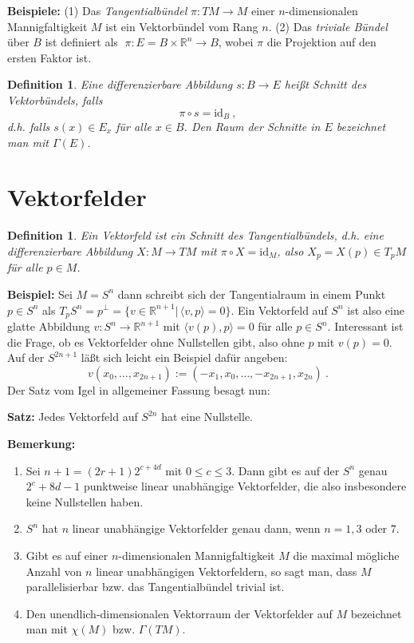 \documentclass[12pt,a4paper]{article}
\def\R{\mathbb{R}}
\def\id{\mathrm{id}}
\def\la{\langle}
\def\ra{\rangle}
\newtheorem{Definition}[Lemma]{Definition}
\begin{document}
\medskip


{\bf Beispiele:} (1) Das {\it Tangentialb\"undel} $\pi:TM\rightarrow M$ einer $n$-dimensionalen Mannigfaltigkeit
$M$ ist ein Vektorb\"undel vom Rang $n$. (2) Das {\it triviale B\"undel} \"uber $B$ ist definiert als
 $\;\pi: E=B\times \R^n\rightarrow B$,
wobei $\pi$ die Projektion auf den ersten Faktor ist.


\medskip


\begin{Definition}
Eine differenzierbare Abbildung $s:B\rightarrow E$ hei\ss t {\em Schnitt} des Vektorb\"undels, falls
$$
\pi \circ s = \id_B \ ,
$$
d.h. falls $s(x)\in E_x$ f\"ur alle $x\in B$. Den Raum der Schnitte in $E$ bezeichnet man mit $\Gamma(E)$.
\end{Definition}


\section{Vektorfelder}

\begin{Definition}
Ein {\em Vektorfeld} ist ein Schnitt des Tangentialb\"undels, d.h. eine differenzierbare
Abbildung $X:M\rightarrow TM$ mit $\pi\circ X = \id_M$, also $X_p=X(p) \in T_pM$ f\"ur
alle $p\in M$.
\end{Definition}

\medskip

{\bf Beispiel:} Sei $M=S^n$ dann schreibt sich der Tangentialraum in einem Punkt
$p\in S^n$ als $T_pS^n = p^\perp =  \{v \in \R^{n+1} | \, \la v, p \ra = 0\}$.
Ein Vektorfeld auf $S^n$ ist also eine glatte Abbildung $v:S^n\rightarrow \R^{n+1}$
mit $\la v(p), p \ra = 0$ f\"ur alle $p\in S^n$. Interessant ist die Frage, ob
es Vektorfelder ohne Nullstellen gibt, also ohne $p$ mit $v(p)=0$. Auf der $S^{2n+1}$
l\"a\ss t sich leicht ein Beispiel daf\"ur angeben:
$$
v(x_0, \ldots, x_{2n+1}) := (-x_1,x_0, \ldots, -x_{2n+1}, x_{2n}) \ .
$$
Der Satz vom Igel in allgemeiner Fassung besagt nun:

\medskip

{\bf Satz:} Jedes Vektorfeld auf $S^{2n}$ hat eine Nullstelle.

\bigskip

{\bf Bemerkung:}
\begin{enumerate}
\item
Sei $n+1= (2r+1)2^{c+4d}$ mit $0\le c \le 3$. Dann gibt es auf der $S^n$
genau $2^c+8d-1$ punktweise linear unabh\"angige Vektorfelder, die also
insbesondere keine Nullstellen haben.

\item
$S^n$ hat $n$ linear unabh\"angige Vektorfelder genau dann, wenn $n=1,3$ oder $7$.

\item
Gibt es auf einer $n$-dimensionalen Mannigfaltigkeit $M$ die maximal m\"ogliche
Anzahl von $n$ linear unabh\"angigen Vektorfeldern, so sagt man, dass $M$
parallelisierbar bzw. das Tangentialb\"undel trivial ist.

\item
Den unendlich-dimensionalen Vektorraum der Vektorfelder auf $M$ bezeichnet man mit
$\chi(M)$ bzw. $\Gamma(TM)$.
\end{enumerate}
\end{document}
